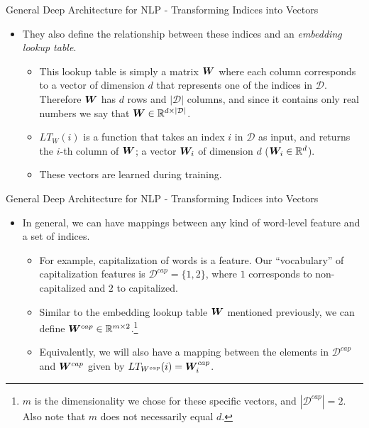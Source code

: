 \documentclass[handout]{beamer} %
\begin{document}
  \begin{frame}{General Deep Architecture for NLP - Transforming Indices into Vectors}
       \begin{itemize}[<+->]
          \item They also define the relationship between these indices and an
              \textit{embedding lookup table}.
              \begin{itemize}

                  \item This lookup table is simply a matrix ${\bm{W}}$ where each column
                     corresponds to a vector of dimension $d$ that represents
                     one of the indices in $\mathcal{D}$. Therefore ${\bm{W}}$
                     has $d$ rows and $|\mathcal{D}|$ columns, and since it
                     contains only real numbers we say that
                     ${\bm{W}}\in{\mathbb{R}}^{d\times|\mathcal{D}|}$.
                  \item $LT_W(i)$ is a function that takes an index $i$ in
                      $\mathcal{D}$ as input, and returns the $i$-th column of
                      ${\bm{W}}$; a vector ${\bm{W}}_i$ of dimension $d$ (${\bm{W}}_i\in{\mathbb{R}}^d$).
                 \item These vectors are learned during training.
              \end{itemize}

      \end{itemize}
  \end{frame}

  \begin{frame}{General Deep Architecture for NLP - Transforming Indices into Vectors}
       \begin{itemize}[<+->]
          \item In general, we can have mappings between any kind of word-level
              feature and a set of indices.
              \begin{itemize}
                  \item For example, capitalization of words is a feature.
                      Our ``vocabulary'' of capitalization features is
                      $\mathcal{D}^{cap}=\{1, 2\}$, where $1$ corresponds to
                      non-capitalized and $2$ to capitalized.
                 \item Similar to the embedding lookup table ${\bm{W}}$ mentioned
                     previously, we can define ${\bm{W}}^{cap}\in{\mathbb{R}}^{m\times
                         2}$.\footnote[frame]{$m$ is the dimensionality we chose for these
                     specific vectors, and $|\mathcal{D}^{cap}|=2$. Also
                 note that $m$ does not necessarily equal $d$.}
                 \item Equivalently, we will also have a mapping between the
                     elements in $\mathcal{D}^{cap}$ and ${\bm{W}}^{cap}$ given by
                     $LT_{W^{cap}}(i)={\bm{W}}^{cap}_{i}$.
              \end{itemize}

      \end{itemize}
     
  \end{frame}
\end{document}
